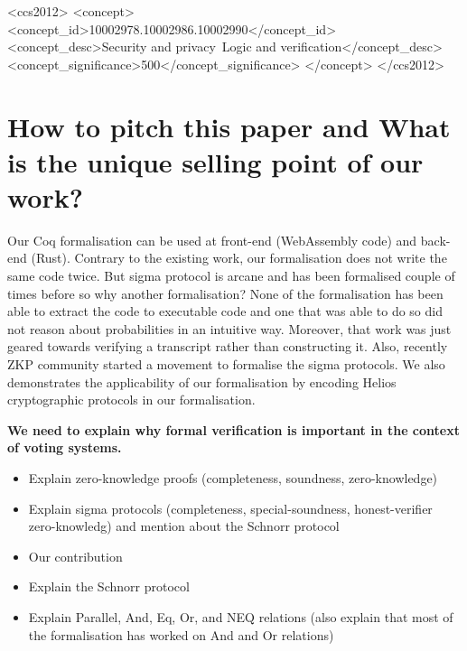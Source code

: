 \documentclass[sigconf]{acmart}
\begin{document}
\begin{CCSXML}
<ccs2012>
  <concept>
      <concept_id>10002978.10002986.10002990</concept_id>
      <concept_desc>Security and privacy~Logic and verification</concept_desc>
      <concept_significance>500</concept_significance>
      </concept>
</ccs2012>
\end{CCSXML}
  




\maketitle

\section{How to pitch this paper and What is the unique selling point of our work?}
Our Coq formalisation can be used at front-end (WebAssembly code) and 
back-end (Rust). Contrary to the existing work, our formalisation
does not write the same code twice. But sigma protocol is arcane and has 
been formalised couple of times before so why another formalisation?
None of the formalisation has been able to extract the code to executable code 
and one that was able to do so did not reason about probabilities in an intuitive way.
Moreover, that work was just geared towards verifying a transcript rather than
constructing it. Also, recently ZKP community started a movement to 
formalise the sigma protocols. We also demonstrates the 
applicability of our formalisation by encoding Helios cryptographic protocols
in our formalisation. 



\textbf{We need to explain why formal verification is important in the context of voting systems.}

\begin{itemize}
  \item Explain zero-knowledge proofs (completeness, soundness, zero-knowledge)
  \item Explain sigma protocols (completeness, special-soundness, honest-verifier zero-knowledg) 
  and mention about the Schnorr protocol
  \item Our contribution
  \item Explain the Schnorr protocol
  \item Explain Parallel, And, Eq, Or, and NEQ relations (also explain that 
  most of the formalisation has worked on And and Or relations)
\end{itemize}
\end{document}
